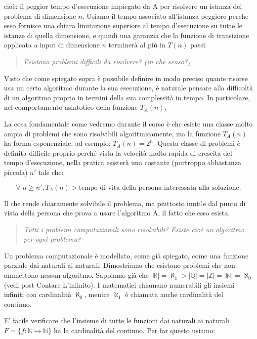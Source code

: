 cioè: il peggior tempo d'esecuzione impiegato da A per risolvere un
istanza del problema di dimensione $n$. Usiamo il tempo associato
all'istanza peggiore perche esso fornisce una chiara limitazione
superiore al tempo d'esecuzione su tutte le istanze di quella
dimensione, e quindi una garanzia che la funzione di transizione
applicata a input di dimensione $n$ terminerà al più in $T(n)$ passi.

\begin{quote}\emph{Esistono problemi difficili da risolvere? (in che
    senso?)}
\end{quote}

Visto che come spiegato sopra è possibile definire in modo preciso
quante risorse usa un certo algoritmo durante la sua esecuzione, è
naturale pensare alla difficoltà di un algoritmo proprio in termini
della sua complessità in tempo. In particolare, nel comportamento
asintotico della funzione $T_A(n)$.

La cosa fondamentale come vedremo durante il corso è che esiste una
classe molto ampia di problemi che sono risolvibili algoritmicamente,
ma la funzione $T_A(n)$ ha forma esponenziale, ad esempio: $T_A(n) =
2^n$. Questa classe di problemi è definita difficile proprio perché
vista la velocità molto rapida di crescita del tempo d'esecuzione,
nella pratica esisterà una costante (purtroppo abbastanza piccola)
$n'$ tale che:

\[\forall\; n \geq n', T_A(n) > \mbox{tempo di vita della persona
  interessata alla soluzione.}\]

Il che rende chiaramente solvibile il problema, ma piuttosto inutile
dal punto di vista della persona che prova a usare l'algoritmo A, il
fatto che esso esista.

\begin{quote}\emph{Tutti i problemi computazionali sono risolvibili?
    Esiste cioè un algoritmo per ogni problema?}\end{quote}

Un problema computazionale è modellato, come già spiegato, come una
funzione parziale dai naturali ai naturali. Dimostriamo che esistono
problemi che non ammettono nessun algoritmo.  Sappiamo già che
$|\mathbb{R}| = \aleph_1 > |\mathbb{Q}| = |\mathbb{Z}| = |\mathbb{N}|
= \aleph_0$ (vedi post Contare L'infinito). I matematici chiamano
numerabili gli insiemi infiniti con cardinalità $\aleph_0$, mentre
$\aleph_1$ è chiamata anche cardinalità del continuo.

E' facile verificare che l'insieme di tutte le funzioni dai naturali
ai naturali $F = \{ f: \mathbb{N} \mapsto \mathbb{N} \}$ ha la
cardinalità del continuo. Per far questo usiamo:

